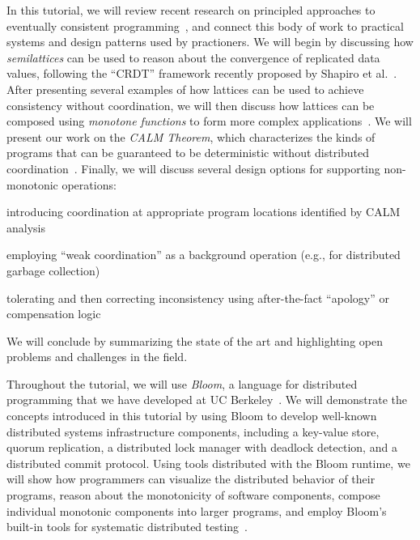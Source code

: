 \documentclass{sig-alternate}
\begin{document}
In this tutorial, we will review recent research on principled approaches to
eventually consistent
programming~\cite{Alvaro2011,Burckhardt2012,Conway2012,Hellerstein2010,Roh2011,Shapiro2011a,Shapiro2011b},
and connect this body of work to practical systems and design patterns used by
practioners. We will begin by discussing how \emph{semilattices} can be used to
reason about the convergence of replicated data values, following the ``CRDT''
framework recently proposed by Shapiro et
al.~\cite{Shapiro2011a,Shapiro2011b}. After presenting several examples of how
lattices can be used to achieve consistency without coordination, we will then
discuss how lattices can be composed using \emph{monotone functions} to form
more complex applications~\cite{Conway2012}. We will present our work on the
\emph{CALM Theorem}, which characterizes the kinds of programs that can be
guaranteed to be deterministic without distributed
coordination~\cite{Alvaro2011,Ameloot2011,Hellerstein2010,dedalus-confluence}. Finally,
we will discuss several design options for supporting non-monotonic operations:
\begin{compactenum}[(a)]
\item introducing coordination at appropriate program locations identified by
  CALM analysis
\item employing ``weak coordination'' as a background operation (e.g., for distributed
garbage collection)
\item tolerating and then correcting inconsistency using
after-the-fact ``apology'' or compensation logic~\cite{Garcia-Molina1987,Helland2009,Korth1990}
\end{compactenum}
We will conclude by summarizing the state of the art and highlighting open
problems and challenges in the field.

Throughout the tutorial, we will use \emph{Bloom}, a language for distributed
programming that we have developed at UC Berkeley~\cite{bloom-website}. We will
demonstrate the concepts introduced in this tutorial by using Bloom to develop
well-known distributed systems infrastructure components, including a key-value
store, quorum replication, a distributed lock manager with deadlock detection,
and a distributed commit protocol. Using tools distributed with the Bloom
runtime, we will show how programmers can visualize the distributed behavior of
their programs, reason about the monotonicity of software components, compose
individual monotonic components into larger programs, and employ Bloom's
built-in tools for systematic distributed testing~\cite{Alvaro2012}.
\end{document}
